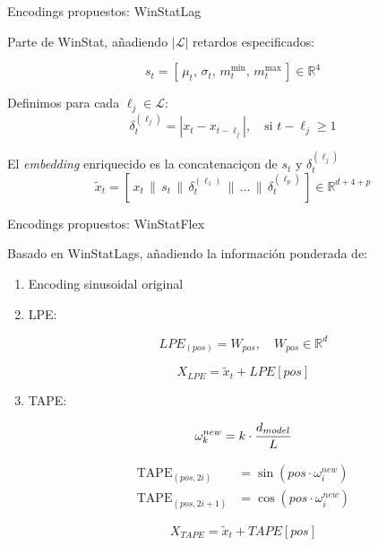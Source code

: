 \documentclass[compress]{beamer}
\begin{document}
	\begin{frame}{Encodings propuestos: WinStatLag}
		
	Parte de WinStat, añadiendo $|\mathcal{L}|$ retardos especificados:
	
	\[
	s_t = [\,\mu_t,\, \sigma_t,\, m^{\min}_t,\, m^{\max}_t\,] \in \mathbb{R}^4
	\]
	
	Definimos para cada $\ell_j \in \mathcal{L}$:
	\[
	\delta_t^{(\ell_j)} = | x_t - x_{t - \ell_j}|, \quad \text{si } t - \ell_j \geq 1
	\]
	
	El \textit{embedding} enriquecido es la concatenaciçon de $s_t$ y $\delta_t^{(\ell_j)}$
	\[
	\tilde{x}_t = [\,x_t \,\|\, s_t \,\|\, \delta_t^{(\ell_1)} \,\|\, \dots \,\|\, \delta_t^{(\ell_p)}\,] \in \mathbb{R}^{d + 4 + p}
	\]

	
	\end{frame}
	
	
	\begin{frame}{Encodings propuestos: WinStatFlex}
		
	Basado en WinStatLags, añadiendo la información ponderada de:
	\begin{enumerate}
	\item Encoding sinusoidal original
	\item LPE:
	
	$$
	LPE_{(pos)} = W_{pos}, \quad W_{pos} \in \mathbb{R}^d
	$$
	
	$$
	X_{LPE} = \tilde{x}_t + LPE[pos]
	$$
	
	\item TAPE:
	
	\begin{equation}
		\centering
		\omega^{new}_k = k \cdot \frac{d_{model}}{L}
	\end{equation}
	
	
	\begin{equation}
		\begin{aligned}
			\text{TAPE}_{(pos,2i)} &= \sin\!\left( pos \cdot \omega^{new}_i \right) \\
			\text{TAPE}_{(pos,2i+1)} &= \cos\!\left( pos \cdot \omega^{new}_i \right)
		\end{aligned}
	\end{equation}
	
	$$
	X_{TAPE} = \tilde{x}_t + TAPE[pos]
	$$
	
		\end{enumerate}
	\end{frame}
	
\end{document}
